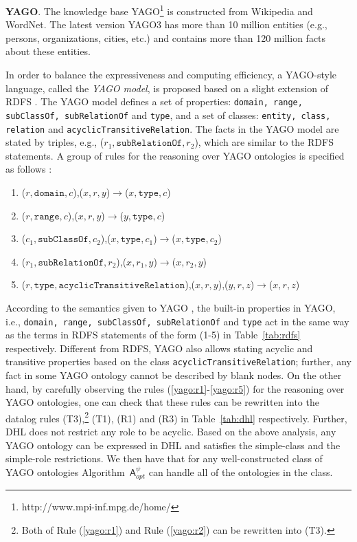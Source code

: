 \textbf{YAGO}. The knowledge base YAGO\footnote{http://www.mpi-inf.mpg.de/home/}
is constructed from Wikipedia and WordNet. The latest version
YAGO3 \cite{MahdisoltaniBS15} has more than 10 million entities
(e.g., persons, organizations, cities, etc.)
and contains more than 120 million facts about these entities.

In order to balance the expressiveness and computing efficiency,
a YAGO-style language, called the \emph{YAGO model}, is proposed based on
a slight extension of RDFS \cite{SuchanekKW08}. The YAGO model defines
a set of properties: \texttt{domain, range, subClassOf, subRelationOf} and \texttt{type},
and a set of classes: \texttt{entity, class, relation} and \texttt{acyclicTransitiveRelation}.
The facts in the YAGO model are stated by triples, e.g., ($r_1,\texttt{subRelationOf},r_2$),
which are similar to the RDFS statements.
A group of rules for the reasoning over YAGO ontologies
is specified as follows \cite{SuchanekKW08}:
\begin{enumerate}[leftmargin=8ex,label=(\arabic*),ref=\arabic*]
  \item ($r,\texttt{domain},c$),($x,r,y$)$\rightarrow$($x,\texttt{type},c$)\label{yago:r1}
  \item ($r,\texttt{range},c$),($x,r,y$)$\rightarrow$($y,\texttt{type},c$)\label{yago:r2}
  \item ($c_1,\texttt{subClassOf},c_2$),($x,\texttt{type},c_1$)$\rightarrow$($x,\texttt{type},c_2$)\label{yago:r3}
  \item ($r_1,\texttt{subRelationOf},r_2$),($x,r_1,y$)$\rightarrow$($x,r_2,y$)\label{yago:r4}
  \item ($r,\texttt{type},\texttt{acyclicTransitiveRelation}$),($x,r,y$),($y,r,z$)$\rightarrow$($x,r,z$)\label{yago:r5}
\end{enumerate}

According to the semantics given to YAGO \cite{SuchanekKW08}, the built-in properties in YAGO,
i.e., \texttt{domain, range, subClassOf, subRelationOf} and \texttt{type} act in the same
way as the terms in RDFS statements of the form (1-5) in Table~\ref{tab:rdfs} respectively.
Different from RDFS, YAGO also allows stating acyclic and transitive properties based on the
class \texttt{acyclicTransitiveRelation}; further, any fact in some YAGO ontology cannot be
described by blank nodes. On the other hand,
by carefully observing the rules (\ref{yago:r1}-\ref{yago:r5}) for the reasoning over YAGO ontologies,
one can check that these rules can be rewritten into the datalog rules (T3),\footnote{Both of Rule (\ref{yago:r1}) and
Rule (\ref{yago:r2}) can be rewritten into (T3).} (T1), (R1) and (R3) in Table~\ref{tab:dhl} respectively.
Further, DHL does not restrict any role to be acyclic.
Based on the above analysis, any YAGO ontology can be expressed in DHL
and satisfies the simple-class and the simple-role restrictions. We then have that
for any well-constructed class of YAGO ontologies Algorithm~$\mathsf{A}_{opt}^{\psi}$
can handle all of the ontologies in the class.

